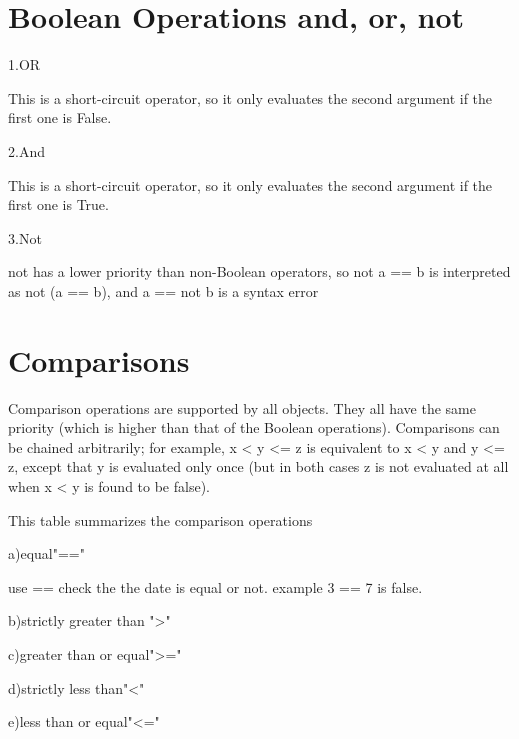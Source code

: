 \section{Boolean Operations  and, or, not}




















  
1.OR

This is a short-circuit operator, so it only evaluates the second argument if the first one is False.


2.And

This is a short-circuit operator, so it only evaluates the second argument if the first one is True.


3.Not


not has a lower priority than non-Boolean operators, so not a == b is interpreted as not (a == b), and a == not b is a syntax error








\section{Comparisons}
Comparison operations are supported by all objects. They all have the same priority (which is higher than that of the Boolean operations). Comparisons can be chained arbitrarily; for example, x < y <= z is equivalent to x < y and y <= z, except that y is evaluated only once (but in both cases z is not evaluated at all when x < y is found to be false).

This table summarizes the comparison operations



a)equal"=="

use == check the the date is equal or not. example 3 == 7 is false.



b)strictly greater than ">"



c)greater than or equal">="




d)strictly less than"<"




e)less than or equal"<="


